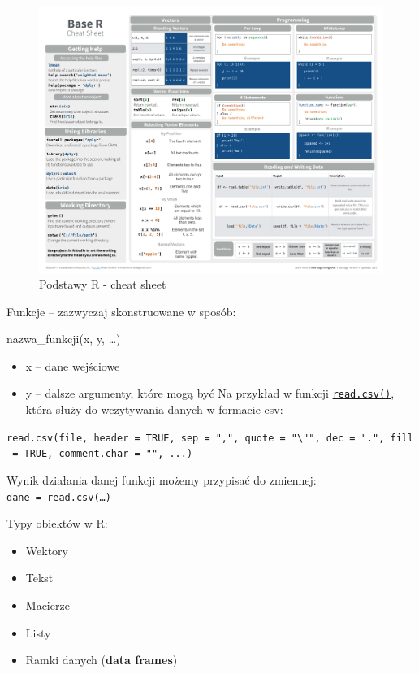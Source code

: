 \documentclass[]{article}
\providecommand{\tightlist}{%
  \setlength{\itemsep}{0pt}\setlength{\parskip}{0pt}}
\begin{document}
\begin{figure}
\centering
\includegraphics{base-r.pdf}
\caption{Podstawy R - cheat sheet}
\end{figure}

Funkcje -- zazwyczaj skonstruowane w sposób:

nazwa\_funkcji(x, y, \ldots{})

\begin{itemize}
\tightlist
\item
  x -- dane wejściowe
\item
  y -- dalsze argumenty, które mogą być Na przykład w funkcji
  \href{https://stat.ethz.ch/R-manual/R-devel/library/utils/html/read.table.html}{\texttt{read.csv()}},
  która służy do wczytywania danych w formacie csv:
\end{itemize}

\texttt{read.csv(file,\ header\ =\ TRUE,\ sep\ =\ ",",\ quote\ =\ "\textbackslash{}"",\ dec\ =\ ".",\ fill\ =\ TRUE,\ comment.char\ =\ "",\ ...)}

Wynik działania danej funkcji możemy przypisać do zmiennej:
\texttt{dane\ =\ read.csv(\ldots{})}

Typy obiektów w R:

\begin{itemize}
\tightlist
\item
  Wektory
\item
  Tekst
\item
  Macierze
\item
  Listy
\item
  Ramki danych (\textbf{data frames})
\end{itemize}
\end{document}
